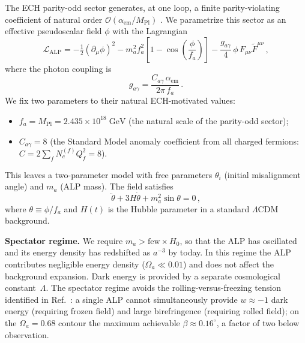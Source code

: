 The ECH parity-odd sector generates, at one loop, a finite parity-violating
coefficient of natural order $\mathcal{O}(\alpha_\mathrm{em}/M_\mathrm{Pl})$
\cite{Alexander2009,Freidel2005}.  We parametrize this sector as an effective
pseudoscalar field $\phi$ with the Lagrangian
%
\begin{equation}
\label{eq:alp_lagrangian}
\mathcal{L}_\mathrm{ALP}
= -\tfrac{1}{2}(\partial_\mu\phi)^2
  - m_a^2 f_a^2\!\left[1 - \cos\!\left(\frac{\phi}{f_a}\right)\right]
  - \frac{g_{a\gamma}}{4}\,\phi\,F_{\mu\nu}\tilde{F}^{\mu\nu} \,,
\end{equation}
%
where the photon coupling is
%
\begin{equation}
\label{eq:coupling}
g_{a\gamma} = \frac{C_{a\gamma}\,\alpha_\mathrm{em}}{2\pi\,f_a} \,.
\end{equation}
%
We fix two parameters to their natural ECH-motivated values:
%
\begin{itemize}
\item $f_a = M_\mathrm{Pl} = 2.435 \times 10^{18}\;\mathrm{GeV}$
  (the natural scale of the parity-odd sector);
\item $C_{a\gamma} = 8$ (the Standard Model anomaly coefficient from all
  charged fermions: $C = 2\sum_f N_c^{(f)} Q_f^2 = 8$).
\end{itemize}
%
This leaves a two-parameter model with free parameters $\theta_i$ (initial
misalignment angle) and $m_a$ (ALP mass).  The field satisfies
%
\begin{equation}
\ddot{\theta} + 3H\dot{\theta} + m_a^2\sin\theta = 0 \,,
\end{equation}
%
where $\theta \equiv \phi/f_a$ and $H(t)$ is the Hubble parameter in a
standard $\Lambda$CDM background.

\medskip
\noindent\textbf{Spectator regime.}  We require $m_a > \mathrm{few}\times
H_0$, so that the ALP has oscillated and its energy density has redshifted as
$a^{-3}$ by today.  In this regime the ALP contributes negligible energy
density ($\Omega_a \ll 0.01$) and does not affect the background expansion.
Dark energy is provided by a separate cosmological constant~$\Lambda$.  The
spectator regime avoids the rolling-versus-freezing tension identified in
Ref.~\cite{Choi2021}: a single ALP cannot simultaneously provide $w \approx
-1$ dark energy (requiring frozen field) and large birefringence (requiring
rolled field); on the $\Omega_a = 0.68$ contour the maximum achievable
$\beta \approx 0.16^\circ$, a factor of two below observation.


